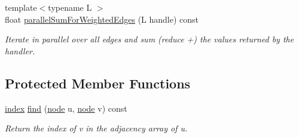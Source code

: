 \begin{DoxyCompactItemize}
{\footnotesize template$<$typename L $>$ }\\float \hyperlink{class_ensemble_clustering_1_1_graph_a2f1d540c74028cf57182e943f2da8102}{parallel\-Sum\-For\-Weighted\-Edges} (L handle) const 
\begin{DoxyCompactList}\small\item\em Iterate in parallel over all edges and sum (reduce +) the values returned by the handler. \end{DoxyCompactList}\end{DoxyCompactItemize}
\subsection*{Protected Member Functions}
\begin{DoxyCompactItemize}
\item 
\hyperlink{namespace_ensemble_clustering_a1ba11e6d628873b803a26fe054f45e28}{index} \hyperlink{class_ensemble_clustering_1_1_graph_a723838db1433dcbe4ac2679e0707d718}{find} (\hyperlink{namespace_ensemble_clustering_ae829290aeccd1a420b17a37fd901f114}{node} u, \hyperlink{namespace_ensemble_clustering_ae829290aeccd1a420b17a37fd901f114}{node} v) const 
\begin{DoxyCompactList}\small\item\em Return the index of v in the adjacency array of u. \end{DoxyCompactList}\end{DoxyCompactItemize}
